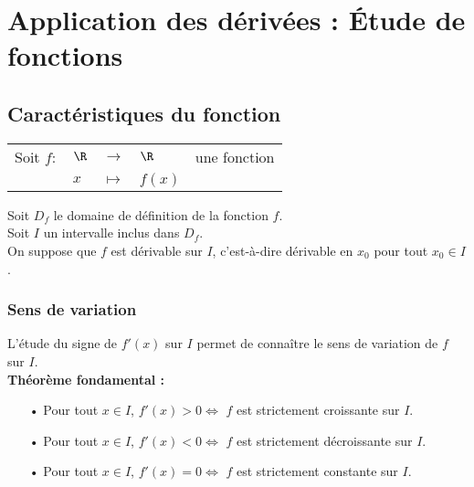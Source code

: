 \ifdefined\COMPLETE
\else
       
    \usepackage{variations}
    
\fi

\section{Application des dérivées : Étude de fonctions}

\subsection{Caractéristiques du fonction}

\begin{tabular}{lllll}
Soit $f :$ & $\R$ & $\longrightarrow$ & $\R$ & une fonction \\
& $x$ & $\longmapsto$ & $f(x)$ & \\
\end{tabular}

\vspace*{.3cm}

Soit $D_f$ le domaine de définition de la fonction $f$. \\
Soit $I$ un intervalle inclus dans $D_f$. \\
On suppose que $f$ est dérivable sur $I$, c'est-à-dire dérivable en $x_0$ pour tout $x_0 \in I$. 

\subsubsection{Sens de variation}

L'étude du signe de $f'(x)$ sur $I$ permet de connaître le sens de variation de $f$ sur $I$. \\

\textbf{Théorème fondamental :} \\

\begin{itemize}
\item[•] Pour tout $x \in I$, $f'(x) > 0 \Longleftrightarrow$ $f$ est strictement croissante sur $I$. 
\item[•] Pour tout $x \in I$, $f'(x) < 0 \Longleftrightarrow$ $f$ est strictement décroissante sur $I$. 
\item[•] Pour tout $x \in I$, $f'(x) = 0 \Longleftrightarrow$ $f$ est strictement constante sur $I$. 
\end{itemize}

\vspace*{.3cm}

